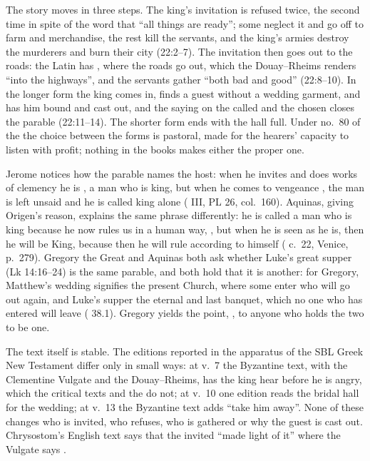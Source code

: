 The story moves in three steps. The king's invitation is refused twice, the
second time in spite of the word that ``all things are ready''; some neglect
it and go off to farm and merchandise, the rest kill the servants, and the
king's armies destroy the murderers and burn their city (22:2--7). The
invitation then goes out to the roads: the Latin has ,
where the roads go out, which the Douay--Rheims renders ``into the highways'',
and the servants gather ``both bad and good'' (22:8--10). In the longer form
the king comes in, finds a guest without a wedding garment, and has him bound
and cast out, and the saying on the called and the chosen closes the parable
(22:11--14). The shorter form ends with the hall full. Under no.~80 of the
 the choice between the forms is pastoral, made for the
hearers' capacity to listen with profit; nothing in the books makes either the
proper one.

Jerome notices how the parable names the host: when he invites and does works
of clemency he is , a man who is king, but when he comes to
vengeance , the man is left unsaid
and he is called king alone ( III, PL 26,
col.~160). Aquinas, giving Origen's reason, explains the same phrase
differently: he is called a man who
is king because he now rules us in a human way, , but when he is seen as he is,
then he will be King, because then he will rule according to himself
( c.~22, Venice, p.~279). Gregory the Great and Aquinas
both ask whether Luke's great supper (Lk 14:16--24) is the same parable, and
both hold that it is another: for Gregory, Matthew's wedding signifies the
present Church, where some enter who will go out again, and Luke's supper the
eternal and last banquet, which no one who has entered will leave
( 38.1). Gregory yields the point, , to anyone who holds the two to be one.

The text itself is stable. The editions reported in the apparatus of the SBL
Greek New Testament differ only in small ways: at v.~7 the Byzantine text, with
the Clementine Vulgate and the Douay--Rheims, has the king hear before he is
angry, which the critical texts and the  do not; at v.~10
one edition reads the bridal hall for the wedding; at v.~13 the Byzantine text
adds ``take him away''. None of these changes who is invited, who refuses, who
is gathered or why the guest is cast out. Chrysostom's English text says that
the invited ``made light of it'' where the Vulgate says .

